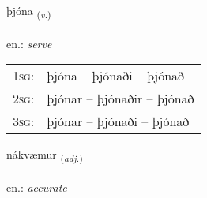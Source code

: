 \documentclass[frontgrid, backgrid]{flacards}\usepackage[]{graphicx}\usepackage[]{xcolor}
\begin{document}
\renewcommand{\flhead}{\vskip5pt \fboxsep=0pt {\small\bfseries\footnotesize Sagnorð | Verb}}
\renewcommand{\fcfoot}{\vskip5pt \fboxsep=0pt \hspace{2pt}{\small\bfseries\footnotesize 2K}}

\renewcommand{\blhead}{\vskip5pt {\small\bfseries\footnotesize Sagnorð | Verb }}
\renewcommand{\bcfoot}{\vskip5pt \hspace{2pt}{\small\bfseries\footnotesize 2K}}


{þjóna \small{\textsubscript{(\textit{v.})}} \\[1ex] %
\textphonetic{[θjouːna]} \\
en.: \emph{serve} \\  [2ex]
\renewcommand*{\arraystretch}{0.8}
\begin{tabular}{p{1cm}l}
\textsc{1sg}: & þjóna -- þjónaði -- þjónað \\ 
\textsc{2sg}: & þjónar -- þjónaðir -- þjónað \\ 
\textsc{3sg}: & þjónar -- þjónaði -- þjónað \\ 
\end{tabular}
}

\renewcommand{\flhead}{\vskip5pt \fboxsep=0pt {\small\bfseries\footnotesize Lýsingarorð | Adjective}}
\renewcommand{\fcfoot}{\vskip5pt \fboxsep=0pt \hspace{2pt}{\small\bfseries\footnotesize 2K}}

\renewcommand{\blhead}{\vskip5pt {\small\bfseries\footnotesize Lýsingarorð | Adjective }}
\renewcommand{\bcfoot}{\vskip5pt \hspace{2pt}{\small\bfseries\footnotesize 2K}}


{nákvæmur \small{\textsubscript{(\textit{adj.})}} \\[1ex] %
\textphonetic{[nauːkʰvaimʏr]} \\
en.: \emph{accurate} \\  [2ex]
\renewcommand*{\arraystretch}{0.8}
}
\end{document}
